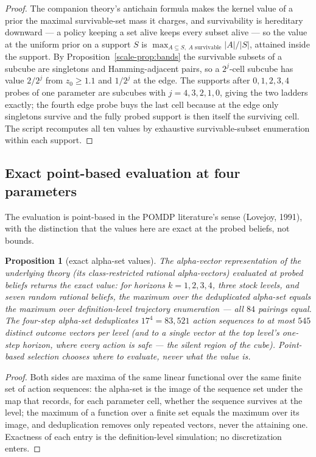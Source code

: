 \documentclass[10pt,twocolumn]{article}
\theoremstyle{plain}
\newtheorem{proposition}[theorem]{Proposition}
\theoremstyle{definition}
\theoremstyle{remark}
\begin{document}
\begin{proof}
The companion theory's antichain formula makes the kernel value of a
prior the maximal survivable-set mass it charges, and survivability is
hereditary downward --- a policy keeping a set alive keeps every
subset alive --- so the value at the uniform prior on a support
\(S\) is \(\max_{A \subseteq S,\ A
\text{ survivable}} |A|/|S|\), attained inside the support. By
Proposition~\ref{scale-prop:bands} the survivable subsets of a subcube are
singletons and Hamming-adjacent pairs, so a \(2^{j}\)-cell subcube
has value \(2/2^{j}\) from \(z_{0} \ge 1.1\) and \(1/2^{j}\) at
the edge. The supports after \(0, 1, 2, 3, 4\) probes of one
parameter are subcubes with \(j = 4, 3, 2, 1, 0\), giving the two
ladders exactly; the fourth edge probe buys the last cell because at
the edge only singletons survive and the fully probed support is then
itself the surviving cell. The script recomputes all ten values by
exhaustive survivable-subset enumeration within each support.
\end{proof}

\subsection{Exact point-based evaluation at four parameters}
\label{scale-pbvi}

The evaluation is point-based in the POMDP literature's sense
(Lovejoy, 1991), with the distinction that the values here are exact at
the probed beliefs, not bounds.

\begin{proposition}[exact alpha-set values]\label{scale-prop:pbvi}
The alpha-vector representation of the underlying theory (its
class-restricted rational alpha-vectors) evaluated at probed beliefs
returns the exact value: for horizons \(k = 1, 2, 3, 4\), three stock
levels, and seven random rational beliefs, the maximum over the
deduplicated alpha-set equals the maximum over definition-level
trajectory enumeration --- all \(84\) pairings equal. The four-step
alpha-set deduplicates \(17^{4} = 83{,}521\) action sequences to at
most \(545\) distinct outcome vectors per level (and to a single
vector at the top level's one-step horizon, where every action is
safe --- the silent region of the cube). Point-based selection
chooses where to evaluate, never what the value is.
\end{proposition}

\begin{proof}
Both sides are maxima of the same linear functional over the same
finite set of action sequences: the alpha-set is the image of the
sequence set under the map that records, for each parameter cell,
whether the sequence survives at the level; the maximum of a function
over a finite set equals the maximum over its image, and
deduplication removes only repeated vectors, never the attaining one.
Exactness of each entry is the definition-level simulation; no
discretization enters.
\end{proof}
\end{document}
